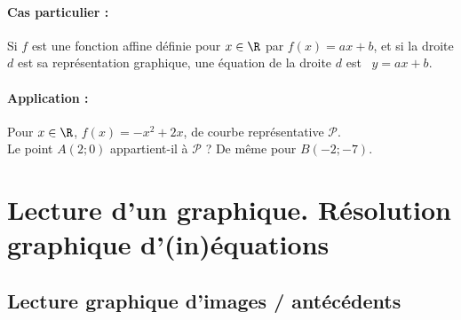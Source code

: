 \paragraph{Cas particulier :} 
\begin{minipage}[t]{0.8\linewidth}
  Si $f$ est une fonction affine définie pour $x\in\R$ par 
  $f(x)=ax+b$, et si la droite $d$ est sa représentation graphique,
  une équation de la droite $d$ est \ $y=ax+b$.
\end{minipage}

\paragraph{Application :} 
\begin{minipage}[t]{0.8\linewidth}
  Pour $x\in\R$, $f(x)=-x^2+2x$, de courbe représentative
  $\mathscr{P}$.\\
  Le point $A(2;0)$ appartient-il à $\mathscr{P}$ ? De même pour
  $B(-2;-7)$.
  \vspace{4cm}
\end{minipage}



\section{Lecture d'un graphique. Résolution graphique d'(in)équations} 

\subsection{Lecture graphique d'images / antécédents}

